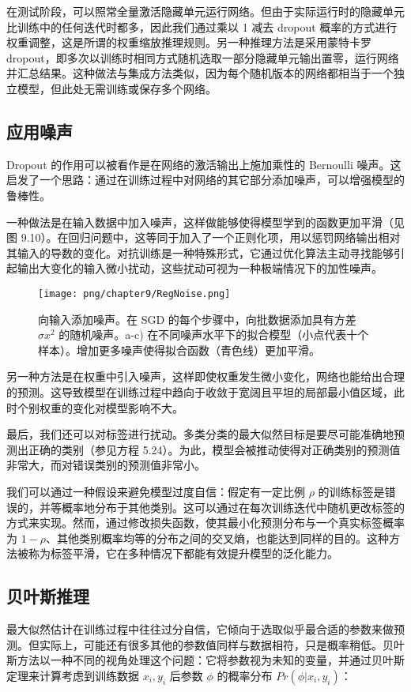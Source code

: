 在测试阶段，可以照常全量激活隐藏单元运行网络。但由于实际运行时的隐藏单元比训练中的任何迭代时都多，因此我们通过乘以 1 减去 dropout 概率的方式进行权重调整，这是所谓的权重缩放推理规则。另一种推理方法是采用蒙特卡罗 dropout，即多次以训练时相同方式随机选取一部分隐藏单元输出置零，运行网络并汇总结果。这种做法与集成方法类似，因为每个随机版本的网络都相当于一个独立模型，但此处无需训练或保存多个网络。
\subsection{应用噪声}
Dropout 的作用可以被看作是在网络的激活输出上施加乘性的 Bernoulli 噪声。这启发了一个思路：通过在训练过程中对网络的其它部分添加噪声，可以增强模型的鲁棒性。

一种做法是在输入数据中加入噪声，这样做能够使得模型学到的函数更加平滑（见图 9.10）。在回归问题中，这等同于加入了一个正则化项，用以惩罚网络输出相对其输入的导数的变化。对抗训练是一种特殊形式，它通过优化算法主动寻找能够引起输出大变化的输入微小扰动，这些扰动可视为一种极端情况下的加性噪声。

\begin{figure}[ht!]
	\centering
	\texttt{[image: png/chapter9/RegNoise.png]}
	\caption{向输入添加噪声。在 SGD 的每个步骤中，向批数据添加具有方差 \(\sigma x^2\) 的随机噪声。a-c) 在不同噪声水平下的拟合模型（小点代表十个样本）。增加更多噪声使得拟合函数（青色线）更加平滑。}
\end{figure}


另一种方法是在权重中引入噪声，这样即使权重发生微小变化，网络也能给出合理的预测。这导致模型在训练过程中趋向于收敛于宽阔且平坦的局部最小值区域，此时个别权重的变化对模型影响不大。

最后，我们还可以对标签进行扰动。多类分类的最大似然目标是要尽可能准确地预测出正确的类别（参见方程 5.24）。为此，模型会被推动使得对正确类别的预测值非常大，而对错误类别的预测值非常小。

我们可以通过一种假设来避免模型过度自信：假定有一定比例 \(\rho\) 的训练标签是错误的，并等概率地分布于其他类别。这可以通过在每次训练迭代中随机更改标签的方式来实现。然而，通过修改损失函数，使其最小化预测分布与一个真实标签概率为 \(1 − \rho\)、其他类别概率均等的分布之间的交叉熵，也能达到同样的目的。这种方法被称为标签平滑，它在多种情况下都能有效提升模型的泛化能力。

\subsection{贝叶斯推理}
最大似然估计在训练过程中往往过分自信，它倾向于选取似乎最合适的参数来做预测。但实际上，可能还有很多其他的参数值同样与数据相符，只是概率稍低。贝叶斯方法以一种不同的视角处理这个问题：它将参数视为未知的变量，并通过贝叶斯定理来计算考虑到训练数据 \({x_i, y_i}\) 后参数 \(\phi\) 的概率分布  \(Pr(\phi | {x_i, y_i})\)：


